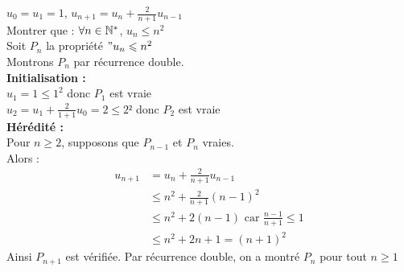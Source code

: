 \begin{exercice}
    $u_0 = u_1 = 1$, $u_{n+1} = u_n + \frac{2}{n+1} u_{n-1}$
    \\
    Montrer que : $\forall n \in \N^*$, $u_n \leq n^2$\\
    Soit $P_n$ la propriété $"u_n \leq n^2$ \\
    Montrons $P_n$ par récurrence double.
    \\
    \textbf{Initialisation :}
    \\
    $u_1 = 1 \leq 1^2$ donc $P_1$ est vraie
    \\
    $u_2 = u_1 + \frac{2}{1+1} u_0 = 2 \leq 2²$ donc $P_2$ est vraie \\
    \textbf{Hérédité :}
    \\
    Pour $n \geq 2$, supposons que $P_{n-1}$ et $P_n$ vraies.
    \\
    Alors :
    \begin{align*}
        u_{n+1} &= u_n + \frac{2}{n+1} u_{n-1} \\
                &\leq n^2 + \frac{2}{n+1} (n-1)^2 \\
                &\leq n^2 + 2 (n - 1) \text{ car } \frac{n - 1}{n + 1} \leq 1 \\
                &\leq n^2 + 2n + 1 = (n + 1)^2
    \end{align*}
    Ainsi $P_{n+1}$ est vérifiée. Par récurrence double, on a montré $P_n$ pour tout $n \geq 1$
\end{exercice}

